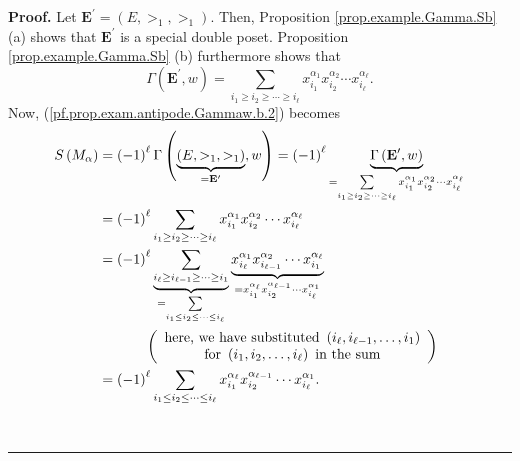 \documentclass[numbers=enddot,12pt,final,onecolumn,notitlepage,abstracton]{scrartcl}
\theoremstyle{definition}
\newenvironment{proof}[1][Proof]{\noindent\textbf{#1.} }{\ \rule{0.5em}{0.5em}}
\let\sumnonlimits\sum
\renewcommand{\sum}{\sumnonlimits\limits}
\newenvironment{verlong}{}{}
\begin{document}
\begin{verlong}
\begin{footnotesize}
\begin{proof}
Let ${\mathbf{E}}^{\prime}=\left(  E,>_{1},>_{1}\right)  $. Then, Proposition
\ref{prop.example.Gamma.Sb} (a) shows that $\mathbf{E}^{\prime}$ is a special
double poset. Proposition \ref{prop.example.Gamma.Sb} (b) furthermore shows
that%
\[
\Gamma\left(  {\mathbf{E}}^{\prime},w\right)  =\sum_{i_{1}\geq i_{2}\geq
\cdots\geq i_{\ell}}x_{i_{1}}^{\alpha_{1}}x_{i_{2}}^{\alpha_{2}}\cdots
x_{i_{\ell}}^{\alpha_{\ell}}.
\]
Now, (\ref{pf.prop.exam.antipode.Gammaw.b.2}) becomes%
\begin{align}
S\left(  M_{\alpha}\right)   &  =\left(  -1\right)  ^{\ell}\Gamma\left(
\underbrace{\left(  E,>_{1},>_{1}\right)  }_{=\mathbf{E}^{\prime}},w\right)
=\left(  -1\right)  ^{\ell}\underbrace{\Gamma\left(  \mathbf{E}^{\prime
},w\right)  }_{=\sum_{i_{1}\geq i_{2}\geq\cdots\geq i_{\ell}}x_{i_{1}}%
^{\alpha_{1}}x_{i_{2}}^{\alpha_{2}}\cdots x_{i_{\ell}}^{\alpha_{\ell}}%
}\nonumber\\
&  =\left(  -1\right)  ^{\ell}\sum_{i_{1}\geq i_{2}\geq\cdots\geq i_{\ell}%
}x_{i_{1}}^{\alpha_{1}}x_{i_{2}}^{\alpha_{2}}\cdots x_{i_{\ell}}^{\alpha
_{\ell}}\label{pf.prop.exam.antipode.Gammaw.b.result1}\\
&  =\left(  -1\right)  ^{\ell}\underbrace{\sum_{i_{\ell}\geq i_{\ell-1}%
\geq\cdots\geq i_{1}}}_{=\sum_{i_{1}\leq i_{2}\leq\cdots\leq i_{\ell}}%
}\underbrace{x_{i_{\ell}}^{\alpha_{1}}x_{i_{\ell-1}}^{\alpha_{2}}\cdots
x_{i_{1}}^{\alpha_{\ell}}}_{=x_{i_{1}}^{\alpha_{\ell}}x_{i_{2}}^{\alpha
_{\ell-1}}\cdots x_{i_{\ell}}^{\alpha_{1}}}\nonumber\\
&  \ \ \ \ \ \ \ \ \ \ \left(
\begin{array}
[c]{c}%
\text{here, we have substituted }\left(  i_{\ell},i_{\ell-1},\ldots
,i_{1}\right) \\
\text{for }\left(  i_{1},i_{2},\ldots,i_{\ell}\right)  \text{ in the sum}%
\end{array}
\right) \nonumber\\
&  =\left(  -1\right)  ^{\ell}\sum_{i_{1}\leq i_{2}\leq\cdots\leq i_{\ell}%
}x_{i_{1}}^{\alpha_{\ell}}x_{i_{2}}^{\alpha_{\ell-1}}\cdots x_{i_{\ell}%
}^{\alpha_{1}}. \label{pf.prop.exam.antipode.Gammaw.b.result2}%
\end{align}



\end{proof}
\end{footnotesize}
\end{verlong}
\end{document}
